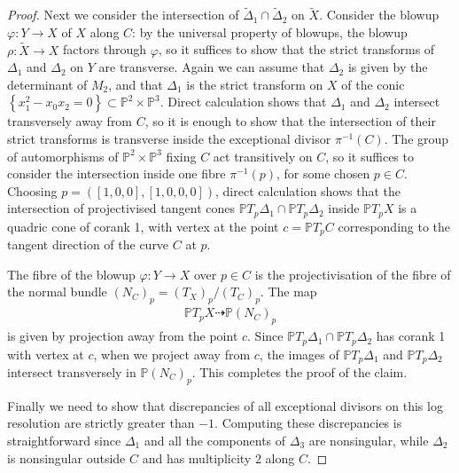 \documentclass[a4paper,11pt]{article}
\newcommand{\PP}{\mathbb P}
\newcommand{\rat}{\dashrightarrow}
\newcommand{\arrow}{\rightarrow}
\begin{document}
\begin{proof}
Next we consider the intersection of $\widetilde{\Delta}_1 \cap \widetilde{\Delta}_2$ on $\widetilde{X}$. Consider the blowup $\varphi \colon Y \arrow X$ of $X$ along $C$: by the universal property of blowups, the blowup $\rho \colon \widetilde{X} \arrow X$ factors through $\varphi$, so it suffices to show that the strict transforms of $\Delta_1$ and $\Delta_2$ on $Y$ are transverse.
Again we can assume that $\Delta_2$ is given by the determinant of $M_2$, and that $\Delta_1$ is the strict transform on $X$ of the conic $\left\{x_1^2-x_0x_2=0\right\} \subset \PP^2 \times \PP^3$.
  Direct calculation shows that $\Delta_1$ and $\Delta_2$ intersect transversely away from $C$, so it is enough to show that the intersection of their strict transforms is transverse inside the exceptional divisor $\pi^{-1}(C)$. The group of automorphisms of $\PP^2 \times \PP^3$ fixing $C$ act transitively on $C$, so it suffices to consider the intersection inside one fibre $\pi^{-1}(p)$, for some chosen $p \in C$. Choosing $p=\left( [1,0,0],[1,0,0,0]\right)$, direct calculation shows that the intersection of projectivised tangent cones $\PP T_p \Delta_1 \cap \PP T_p \Delta_2$ inside $\PP T_p X$ is a quadric cone of corank 1, with vertex at the point $c=\PP T_p C$ corresponding to the tangent direction of the curve $C$ at $p$.

  The fibre of the blowup $\varphi \colon Y \arrow X$ over $p \in C$ is the projectivisation of the fibre of the normal bundle $(N_C)_p = (T_X)_p/(T_C)_p$. The map
  \begin{align*}
    \PP T_p X \rat \PP (N_C)_p
  \end{align*}
  is given by projection away from the point $c$. Since $\PP T_p \Delta_1 \cap \PP T_p \Delta_2$ has corank 1 with vertex at $c$, when we project away from $c$, the images of $\PP T_p \Delta_1$ and $\PP T_p \Delta_2$ intersect transversely in $\PP (N_C)_p$. This completes the proof of the claim.
  
  Finally we need to show that discrepancies of all exceptional divisors on this log resolution are strictly greater than $-1$. Computing these discrepancies is straightforward since $\Delta_1$ and all the components of $\Delta_3$ are nonsingular, while $\Delta_2$ is nonsingular outside $C$ and has multiplicity 2 along $C$.
  

\end{proof}
\end{document}
